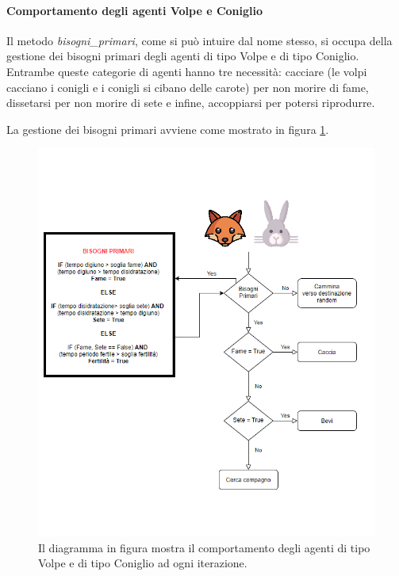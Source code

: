 \documentclass[11pt]{article}
\begin{document}
\paragraph{Comportamento degli agenti Volpe e Coniglio}

Il metodo \emph{bisogni\_primari}, come si può intuire dal nome stesso, si occupa della gestione dei bisogni primari degli agenti di tipo Volpe e di tipo Coniglio. Entrambe queste categorie di agenti hanno tre necessità: cacciare (le volpi cacciano i conigli e i conigli si cibano delle carote) per non morire di fame, dissetarsi per non morire di sete e infine, accoppiarsi per potersi riprodurre. 

La gestione dei bisogni primari avviene come mostrato in figura \ref{fig:diagrammaComportamentale}. 
\begin{figure}
     \centering
     \includegraphics[scale = 0.75]{diagramma_comportamentale.png}
     \caption{Il diagramma in figura mostra il comportamento degli agenti di tipo Volpe e di tipo Coniglio ad ogni iterazione.}
     \label{fig:diagrammaComportamentale}
\end{figure}
\end{document}
